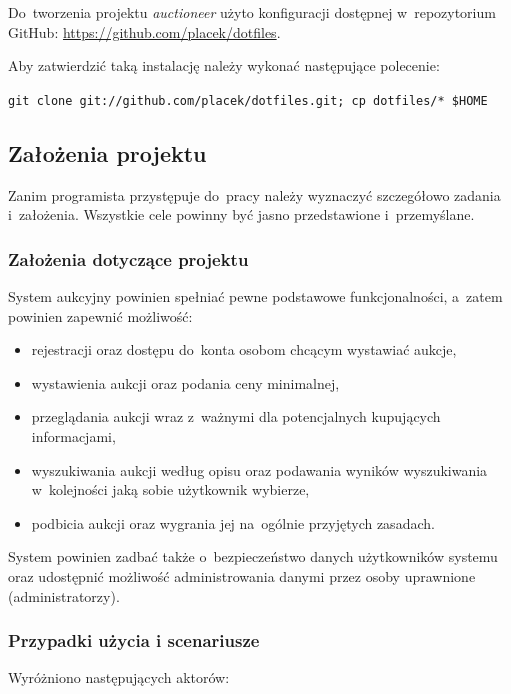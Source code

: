 Do~tworzenia projektu \textit{auctioneer} użyto konfiguracji dostępnej w~repozytorium GitHub: \url{https://github.com/placek/dotfiles}.


Aby zatwierdzić taką instalację należy wykonać następujące polecenie:


\texttt{git clone git://github.com/placek/dotfiles.git; cp dotfiles/* \$HOME}

\subsection{Założenia projektu}

Zanim programista przystępuje do~pracy należy wyznaczyć szczegółowo zadania i~założenia. Wszystkie cele powinny być jasno przedstawione i~przemyślane.

\subsubsection{Założenia dotyczące projektu}

System aukcyjny powinien spełniać pewne podstawowe funkcjonalności, a~zatem powinien zapewnić możliwość:

\begin{itemize}
  \item rejestracji oraz dostępu do~konta osobom chcącym wystawiać aukcje,
  \item wystawienia aukcji oraz podania ceny minimalnej,
  \item przeglądania aukcji wraz z~ważnymi dla potencjalnych kupujących informacjami,
  \item wyszukiwania aukcji według opisu oraz podawania wyników wyszukiwania w~kolejności jaką sobie użytkownik wybierze,
  \item podbicia aukcji oraz wygrania jej na~ogólnie przyjętych zasadach.
\end{itemize}

System powinien zadbać także o~bezpieczeństwo danych użytkowników systemu oraz udostępnić możliwość administrowania danymi przez osoby uprawnione (administratorzy).


\subsubsection{Przypadki użycia i scenariusze}

Wyróżniono następujących aktorów:

